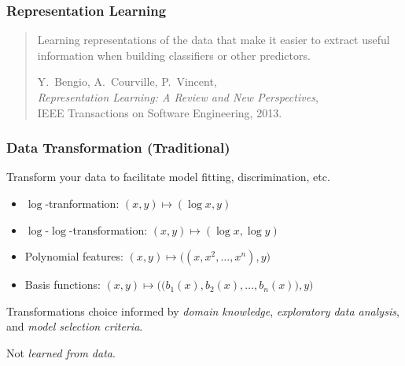 \documentclass[xcolor={dvipsnames}]{beamer}
\newcommand{\df}[1]{\textcolor{BrickRed}{\emph{#1}}}
\begin{document}
\begin{frame}
    \frametitle{Representation Learning}
\begin{quote}
    \normalfont \large
Learning representations of the data that make it easier to extract useful information when building classifiers or other predictors.

\bigskip
\begin{flushright}
\small \normalfont Y.\ Bengio, A.\ Courville, P.\ Vincent,\\ \emph{Representation Learning: A Review and New Perspectives},\\
    IEEE Transactions on Software Engineering, 2013.
\end{flushright}
\end{quote}
\end{frame}

\begin{frame}
    \frametitle{Data Transformation (Traditional)}
    \setlength{\parskip}{1em}

    Transform your data to facilitate model fitting, discrimination, etc.
    \begin{itemize}
        \setlength\itemsep{0.5em}
        \item $\log$-tranformation: $(x, y)\mapsto (\log x, y)$
        \item $\log$-$\log$-transformation: $(x, y)\mapsto (\log x, \log y)$
        \item Polynomial features: $(x,y)\mapsto \big((x,x^2,\ldots,x^n), y\big)$
        \item Basis functions: $(x,y)\mapsto \big(\big(b_1(x),b_2(x),\ldots,b_n(x)\big), y\big)$
    \end{itemize}

    Transformations choice informed by \df{domain knowledge}, \df{exploratory data analysis}, and \df{model selection criteria}.
    
    Not \df{learned from data}.
\end{frame}
\end{document}
